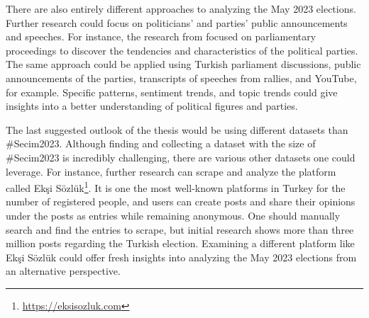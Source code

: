 There are also entirely different approaches to analyzing the May 2023 elections. Further research 
could focus on politicians' and parties' public announcements and speeches. For instance, the 
research from \textcite{contreras_panama_lda_bertopic_2022} focused on parliamentary proceedings to 
discover the tendencies and characteristics of the political parties. The same approach could be 
applied using Turkish parliament discussions, public announcements of the parties, transcripts of 
speeches from rallies, and YouTube, for example. Specific patterns, sentiment trends, and topic 
trends could give insights into a better understanding of political figures and parties.

The last suggested outlook of the thesis would be using different datasets than \#Secim2023. 
Although finding and collecting a dataset with the size of \#Secim2023 is incredibly challenging, 
there are various other datasets one could leverage. For instance, further research can scrape and 
analyze the platform called Ekşi Sözlük\footnote{\url{https://eksisozluk.com}}. It is one the most 
well-known platforms in Turkey for the number of registered people, and users can create posts and 
share their opinions under the posts as entries while remaining anonymous. One should manually 
search and find the entries to scrape, but initial research shows more than three million posts 
regarding the Turkish election. Examining a different platform  like Ekşi Sözlük could offer fresh 
insights into analyzing the May 2023 elections from an alternative perspective.
